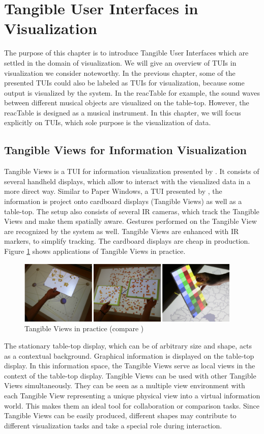 \section{Tangible User Interfaces in Visualization}
The purpose of this chapter is to introduce Tangible User Interfaces which are settled in the domain of visualization. We will give an overview of TUIs in visualization we consider noteworthy. In the previous chapter, some of the presented TUIs could also be labeled as TUIs for visualization, because some output is visualized by the system. In the reacTable for example, the sound waves between different musical objects are visualized on the table-top. However, the reacTable is designed as a musical instrument. In this chapter, we will focus explicitly on TUIs, which sole purpose is the visualization of data.

\subsection{Tangible Views for Information Visualization}
Tangible Views is a TUI for information visualization presented by \cite{spindler10}. It consists of several handheld displays, which allow to interact with the visualized data in a more direct way. Similar to Paper Windows, a TUI presented by \cite{holman05}, the information is project onto cardboard displays (Tangible Views) as well as a table-top. The setup also consists of several IR cameras, which track the Tangible Views and make them spatially aware. Gestures performed on the Tangible View are recognized by the system as well. Tangible Views are enhanced with IR markers, to simplify tracking. The cardboard displays are cheap in production. Figure \ref{fig:tangible_views} shows applications of Tangible Views in practice.

\begin{figure}[htb]
\centering
\includegraphics[width=0.95\textwidth]{figures/tangible_views.png}
\caption{Tangible Views in practice (compare \protect\cite{spindler10})}
\label{fig:tangible_views}
\end{figure}

The stationary table-top display, which can be of arbitrary size and shape, acts as a contextual background. Graphical information is displayed on the table-top display. In this information space, the Tangible Views serve as local views in the context of the table-top display. Tangible Views can be used with other Tangible Views simultaneously. They can be seen as a multiple view environment with each Tangible View representing a unique physical view into a virtual information world. This makes them an ideal tool for collaboration or comparison tasks. Since Tangible Views can be easily produced, different shapes may contribute to different visualization tasks and take a special role during interaction.

